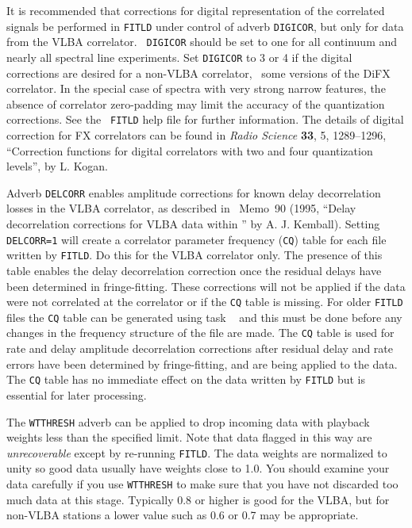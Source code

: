 It is recommended that corrections for digital representation of the
correlated signals be performed in {\tt FITLD} under control of adverb
{\tt DIGICOR}, but only for data from the VLBA correlator.  {\tt
DIGICOR} should be set to one for all continuum and nearly all
spectral line experiments.  Set {\tt DIGICOR} to 3 or 4 if the digital
corrections are desired for a non-VLBA correlator, \eg\ some versions
of the DiFX correlator.  In the special case of spectra with very
strong narrow features, the absence of correlator zero-padding may
limit the accuracy of the quantization corrections.  See the {\tt
FITLD} help file for further information.  The details of digital
correction for FX correlators can be found in {\it Radio Science\/}
{\bf 33}, 5, 1289--1296,  ``Correction functions for digital
correlators with two and four quantization levels'', by L. Kogan.

Adverb {\tt DELCORR} enables amplitude corrections for known delay
decorrelation losses in the VLBA correlator, as described in \AIPS\
Memo~90 (1995, ``Delay decorrelation corrections for VLBA data within
\AIPS'' by A. J. Kemball). Setting {\tt DELCORR=1} will create a
correlator parameter frequency ({\tt CQ}) table for each file written
by {\tt FITLD}\@.  Do this for the VLBA correlator only.  The presence
of this table enables the delay decorrelation correction once the
residual delays have been determined in fringe-fitting. These
corrections will not be applied if the data were not correlated at the
\Indx{VLBA} correlator or if the {\tt CQ} table is missing.  For older
{\tt FITLD} files the {\tt CQ} table can be generated using task {\tt
\tndx{FXVLB}} and this must be done before any changes in the
frequency structure of the file are made. The {\tt CQ} table is used
for rate and delay amplitude decorrelation corrections after residual
delay and rate errors have been determined by fringe-fitting, and are
being applied to the data.  The {\tt CQ} table has no immediate effect
on the data written by {\tt FITLD} but is essential for later
processing.

The {\tt WTTHRESH} adverb can be applied to drop incoming data with
playback weights less than the specified limit.  Note that data
flagged in this way are {\it unrecoverable\/} except by re-running
{\tt FITLD}\@.  The data weights are normalized to unity so good data
usually have weights close to 1.0.  You should examine your data
carefully if you use {\tt WTTHRESH} to make sure that you have not
discarded too much data at this stage.  Typically 0.8 or higher is
good for the VLBA, but for non-VLBA stations a lower value such as 0.6
or 0.7 may be appropriate.\Iodx{VLBI}

